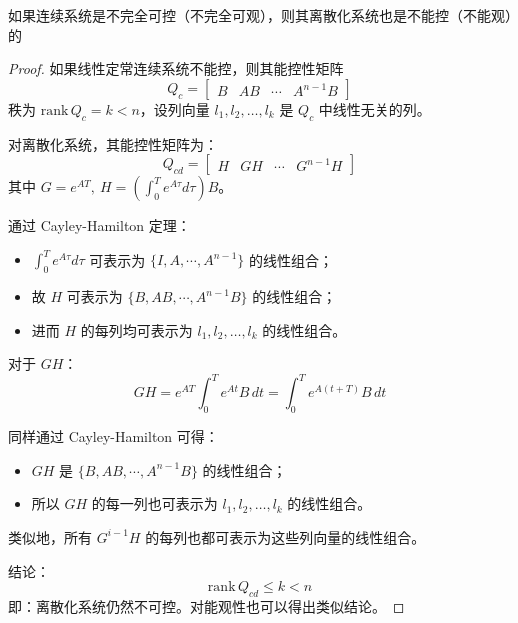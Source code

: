 \begin{proposition}
    如果连续系统是不完全可控（不完全可观），则其离散化系统也是不能控（不能观）的
    \begin{proof}
        如果线性定常连续系统不能控，则其能控性矩阵
        \begin{equation*}
            Q_c = \begin{bmatrix} B & AB & \cdots & A^{n-1}B \end{bmatrix}
        \end{equation*}
        秩为 $\mathrm{rank}\,Q_c = k < n$，设列向量 $l_1, l_2, \ldots, l_k$ 是 $Q_c$ 中线性无关的列。

        对离散化系统，其能控性矩阵为：
        \begin{equation*}
            Q_{cd} = \begin{bmatrix} H & GH & \cdots & G^{n-1}H \end{bmatrix}
        \end{equation*}
        其中 $G = e^{AT},\ H = \left(\displaystyle\int_0^T e^{A\tau} d\tau\right) B$。

        通过 Cayley-Hamilton 定理：
        \begin{itemize}
            \item $\int_0^T e^{A\tau} d\tau$ 可表示为 $\{I, A, \cdots, A^{n-1}\}$ 的线性组合；
            \item 故 $H$ 可表示为 $\{B, AB, \cdots, A^{n-1}B\}$ 的线性组合；
            \item 进而 $H$ 的每列均可表示为 $l_1, l_2, \ldots, l_k$ 的线性组合。
        \end{itemize}

        对于 $GH$：
        \begin{equation*}
            GH = e^{AT} \int_0^T e^{At} B \,dt = \int_0^T e^{A(t+T)} B \,dt
        \end{equation*}

        同样通过 Cayley-Hamilton 可得：
        \begin{itemize}
            \item $GH$ 是 $\{B, AB, \cdots, A^{n-1}B\}$ 的线性组合；
            \item 所以 $GH$ 的每一列也可表示为 $l_1, l_2, \ldots, l_k$ 的线性组合。
        \end{itemize}

        类似地，所有 $G^{i-1}H$ 的每列也都可表示为这些列向量的线性组合。

        结论：
        \begin{equation*}
            \mathrm{rank}\,Q_{cd} \le k < n
        \end{equation*}
        即：离散化系统仍然不可控。对能观性也可以得出类似结论。

    \end{proof}
\end{proposition}

